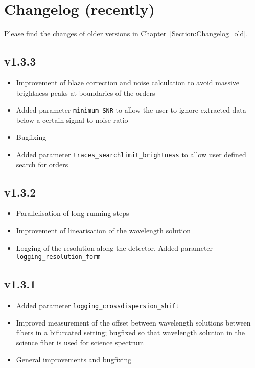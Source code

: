 \documentclass[10pt,a4paper]{article}
\begin{document}
\newpage

\section{Changelog (recently)}
\label{Section:Changelog_new}
Please find the changes of older versions in Chapter~\ref{Section:Changelog_old}.

\subsection*{v1.3.3}
\begin{itemize}\setlength\itemsep{0em}
  \item Improvement of blaze correction and noise calculation to avoid massive brightness peaks at boundaries of the orders
  \item Added parameter \verb|minimum_SNR| to allow the user to ignore extracted data below a certain signal-to-noise ratio
  \item Bugfixing
  \item Added parameter \verb|traces_searchlimit_brightness| to allow user defined search for orders
\end{itemize}

\subsection*{v1.3.2}
\begin{itemize}\setlength\itemsep{0em}
  \item Parallelisation of long running steps
  \item Improvement of linearisation of the wavelength solution
  \item Logging of the resolution along the detector. Added parameter \verb|logging_resolution_form|
\end{itemize}

\subsection*{v1.3.1}
\begin{itemize}\setlength\itemsep{0em}
  \item Added parameter \verb|logging_crossdispersion_shift|
  \item Improved measurement of the offset between wavelength solutions between fibers in a bifurcated setting; bugfixed so that wavelength solution in the science fiber is used for science spectrum
  \item General improvements and bugfixing
\end{itemize}
\end{document}

